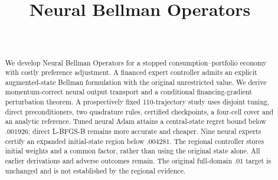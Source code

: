 \documentclass[ecta]{econsocart}
\theoremstyle{remark}
\begin{document}
\begin{frontmatter}
\title{Neural Bellman Operators}
\begin{aug}
\author[id=au1,addressref={add1}]{~}
\address[id=add1]{}
\end{aug}
\begin{abstract}We develop Neural Bellman Operators for a stopped consumption--portfolio economy with costly preference adjustment. A financed expert controller admits an explicit augmented-state Bellman formulation with the original unrestricted value. We derive momentum-correct neural output transport and a conditional financing-gradient perturbation theorem. A prospectively fixed 110-trajectory study uses disjoint tuning, direct preconditioners, two quadrature rules, certified checkpoints, a four-cell cover and an analytic reference. Tuned neural Adam attains a central-state regret bound below $.001926$; direct L-BFGS-B remains more accurate and cheaper. Nine neural experts certify an expanded initial-state region below $.004281$. The regional controller stores initial weights and a common factor, rather than using the original state alone. All earlier derivations and adverse outcomes remain. The original full-domain $.01$ target is unchanged and is not established by the regional evidence.\end{abstract}
\begin{keyword}
\end{keyword}
\end{frontmatter}







\begin{appendix}











\end{appendix}
\clearpage
\end{document}
